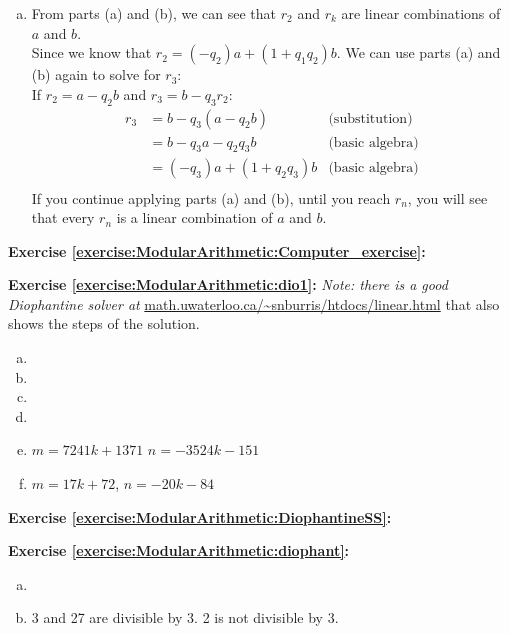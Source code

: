 \begin{enumerate}[(a)]
\item
From parts (a) and (b), we can see that $r_{2}$ and $r_{k}$ are linear combinations of $a$ and $b$.\\
Since we know that $r_{2} = (-q_{2})a + (1 + q_{1}q_{2})b$. We can use parts (a) and (b) again to solve for $r_{3}$:\\
If $r_{2} = a - q_{2}b$ and $r_{3} = b - q_{3}r_{2}$:
\begin{align*}
r_{3} &= b - q_{3}(a - q_{2}b) &\text{(substitution)}\\
&= b - q_{3}a - q_{2}q_{3}b &\text{(basic algebra)}\\
&= (-q_{3})a + (1 + q_{2}q_{3})b &\text{(basic algebra)}\\
\end{align*}
If you continue applying parts (a) and (b), until you reach $r_{n}$, you will see that every $r_{n}$ is a linear combination of $a$ and $b$.
\end{enumerate}

\noindent\textbf{Exercise \ref{exercise:ModularArithmetic:Computer_exercise}:}

\noindent\textbf{Exercise \ref{exercise:ModularArithmetic:dio1}:} 
\emph{Note: there is a good  Diophantine solver at} \url{math.uwaterloo.ca/~snburris/htdocs/linear.html} that also shows
the steps of the solution.
\begin{enumerate} [(a)]
\item
\item
\item
\item
\item
$m=7241k+1371$ $n=-3524k-151$
\item
$m=17k+72$, $n=-20k-84$
\end {enumerate}

\noindent\textbf{Exercise \ref{exercise:ModularArithmetic:DiophantineSS}:}

\noindent\textbf{Exercise \ref{exercise:ModularArithmetic:diophant}:}
\begin{enumerate} [(a)]
\item
\item
3 and 27 are divisible by 3. 2 is not divisible by 3.
\end {enumerate}

